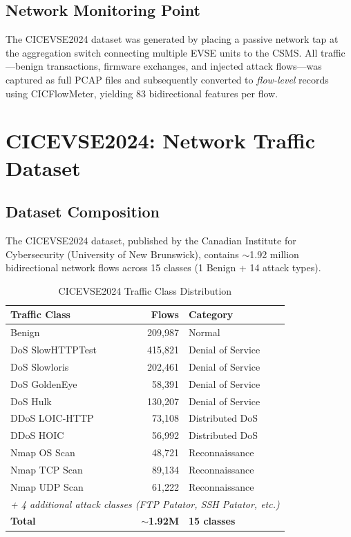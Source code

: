 \documentclass[11pt, a4paper]{article}
\begin{document}
\subsection{Network Monitoring Point}

The CICEVSE2024 dataset was generated by placing a passive network tap at the aggregation switch connecting multiple EVSE units to the CSMS. All traffic—benign transactions, firmware exchanges, and injected attack flows—was captured as full PCAP files and subsequently converted to \textit{flow-level} records using CICFlowMeter, yielding 83 bidirectional features per flow.

\section{CICEVSE2024: Network Traffic Dataset}

\subsection{Dataset Composition}

The CICEVSE2024 dataset, published by the Canadian Institute for Cybersecurity (University of New Brunswick), contains $\sim$1.92 million bidirectional network flows across 15 classes (1 Benign + 14 attack types).

\begin{table}[H]
\centering
\caption{CICEVSE2024 Traffic Class Distribution}
\begin{tabular}{|l|r|l|}
    \hline
    \textbf{Traffic Class} & \textbf{Flows} & \textbf{Category} \\ \hline
    Benign & 209,987 & Normal \\ \hline
    DoS SlowHTTPTest & 415,821 & Denial of Service \\ \hline
    DoS Slowloris & 202,461 & Denial of Service \\ \hline
    DoS GoldenEye & 58,391 & Denial of Service \\ \hline
    DoS Hulk & 130,207 & Denial of Service \\ \hline
    DDoS LOIC-HTTP & 73,108 & Distributed DoS \\ \hline
    DDoS HOIC & 56,992 & Distributed DoS \\ \hline
    Nmap OS Scan & 48,721 & Reconnaissance \\ \hline
    Nmap TCP Scan & 89,134 & Reconnaissance \\ \hline
    Nmap UDP Scan & 61,222 & Reconnaissance \\ \hline
    \multicolumn{3}{|l|}{\textit{+ 4 additional attack classes (FTP Patator, SSH Patator, etc.)}} \\ \hline
    \textbf{Total} & \textbf{$\sim$1.92M} & \textbf{15 classes} \\ \hline
\end{tabular}
\end{table}
\end{document}
